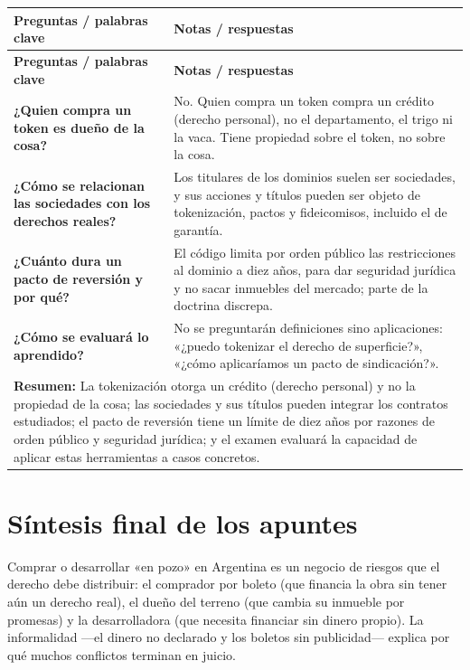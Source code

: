 \documentclass[12pt,oneside]{book}
\newcommand{\cornellresumen}[1]{%
  \multicolumn{2}{p{\dimexpr0.89\textwidth+2\tabcolsep\relax}}{\textbf{Resumen:} #1}\\}
\begin{document}
\begin{longtable}{p{}p{}}
\toprule
\textbf{Preguntas / palabras clave} & \textbf{Notas / respuestas} \\
\midrule
\endfirsthead
\toprule
\textbf{Preguntas / palabras clave} & \textbf{Notas / respuestas} \\
\midrule
\endhead

\textbf{¿Quien compra un token es dueño de la cosa?} &
No. Quien compra un token compra un crédito (derecho personal), no el departamento, el trigo ni la vaca. Tiene propiedad sobre el token, no sobre la cosa. \\[0.6em]

\textbf{¿Cómo se relacionan las sociedades con los derechos reales?} &
Los titulares de los dominios suelen ser sociedades, y sus acciones y títulos pueden ser objeto de tokenización, pactos y fideicomisos, incluido el de garantía. \\[0.6em]

\textbf{¿Cuánto dura un pacto de reversión y por qué?} &
El código limita por orden público las restricciones al dominio a diez años, para dar seguridad jurídica y no sacar inmuebles del mercado; parte de la doctrina discrepa. \\[0.6em]

\textbf{¿Cómo se evaluará lo aprendido?} &
No se preguntarán definiciones sino aplicaciones: «¿puedo tokenizar el derecho de superficie?», «¿cómo aplicaríamos un pacto de sindicación?». \\

\midrule
\cornellresumen{La tokenización otorga un crédito (derecho personal) y no la propiedad de la cosa; las sociedades y sus títulos pueden integrar los contratos estudiados; el pacto de reversión tiene un límite de diez años por razones de orden público y seguridad jurídica; y el examen evaluará la capacidad de aplicar estas herramientas a casos concretos.}
\bottomrule
\end{longtable}

\chapter[Síntesis final]{Síntesis final de los apuntes}

Comprar o desarrollar «en pozo» en Argentina es un negocio de riesgos que el derecho debe distribuir: el comprador por boleto (que financia la obra sin tener aún un derecho real), el dueño del terreno (que cambia su inmueble por promesas) y la desarrolladora (que necesita financiar sin dinero propio). La informalidad —el dinero no declarado y los boletos sin publicidad— explica por qué muchos conflictos terminan en juicio.
\end{document}
